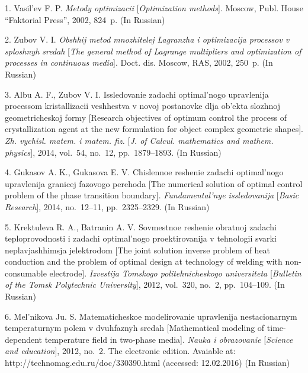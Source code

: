 

{\footnotesize

\vskip 2mm


\vskip 1.5mm



1. Vasil'ev F. P. {\it Metody optimizacii} [{\it Optimization
methods}]. Moscow, Publ. House ``Faktorial Press'', 2002, 824~p.
(In Russian)

2. Zubov V. I. {\it Obshhij metod mnozhitelej Lagranzha i
optimizacija processov v sploshnyh sredah} [{\it The general
method of Lagrange multipliers and optimization of processes in
continuous media}]. Doct. dis. Moscow, RAS, 2002, 250~p. (In
Russian)

3. Albu A. F., Zubov V. I. Issledovanie zadachi optimal'nogo
upravlenija processom kristallizacii veshhestva v novoj postanovke
dlja ob'ekta slozhnoj geometricheskoj formy [Research objectives
of optimum control the process of crystallization agent at the new
formulation for object complex geometric shapes]. {\it Zh.
vychisl. matem. i matem. fiz.} [\textit{J. of Calcul. mathematics
and mathem. physics}], 2014, vol.~54, no.~12, pp.~1879--1893. (In
Russian)

4. Gukasov A. K., Gukasova E. V. Chislennoe reshenie zadachi
optimal'nogo upravlenija granicej fazovogo perehoda [The numerical
solution of optimal control problem of the phase transition
boundary]. {\it Fundamental'nye  issledovanija} [\textit{Basic
Research}], 2014, no.~12--11, pp.~2325--2329. (In Russian)

5. Krektuleva R. A., Batranin A. V. Sovmestnoe reshenie obratnoj
zadachi teploprovodnosti i zadachi optimal'nogo proektirovanija v
tehnologii svarki neplavjashhimsja jelektrodom [The joint solution
inverse problem of heat conduction and the problem of optimal
design at technology of welding with non-consumable electrode].
{\it Izvestija Tomskogo politehnicheskogo universiteta}
[\textit{Bulletin of the Tomsk Polytechnic University}], 2012,
vol.~320, no.~2, pp.~104--109. (In Russian)

6. Mel'nikova Ju. S. Matematicheskoe modelirovanie upravlenija
nestacionarnym temperaturnym polem v dvuhfaznyh sredah
[Mathematical modeling of time-dependent temperature field in
two-phase media]. {\it Nauka i obrazovanie} [\textit{Science and
education}], 2012, no.~2. The electronic edition. Avaiable at:
http://technomag.edu.ru/doc/330390.html (accessed: 12.02.2016) (In
Russian)

}
